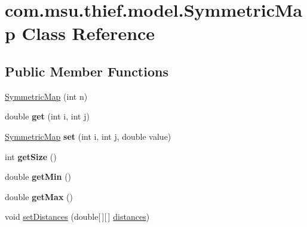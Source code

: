 \hypertarget{classcom_1_1msu_1_1thief_1_1model_1_1SymmetricMap}{\section{com.\-msu.\-thief.\-model.\-Symmetric\-Map Class Reference}
\label{classcom_1_1msu_1_1thief_1_1model_1_1SymmetricMap}
}
\subsection*{Public Member Functions}
\begin{DoxyCompactItemize}
\item 
\hyperlink{classcom_1_1msu_1_1thief_1_1model_1_1SymmetricMap_a44db52139f57eef76ba9b64d61059af7}{Symmetric\-Map} (int n)
\item 
\hypertarget{classcom_1_1msu_1_1thief_1_1model_1_1SymmetricMap_ac58ed31c7760c1c8bfc7a158f85c7f4f}{double {\bfseries get} (int i, int j)}\label{classcom_1_1msu_1_1thief_1_1model_1_1SymmetricMap_ac58ed31c7760c1c8bfc7a158f85c7f4f}

\item 
\hypertarget{classcom_1_1msu_1_1thief_1_1model_1_1SymmetricMap_a75dc77beaa0bfee44a501d9f40aff019}{\hyperlink{classcom_1_1msu_1_1thief_1_1model_1_1SymmetricMap}{Symmetric\-Map} {\bfseries set} (int i, int j, double value)}\label{classcom_1_1msu_1_1thief_1_1model_1_1SymmetricMap_a75dc77beaa0bfee44a501d9f40aff019}

\item 
\hypertarget{classcom_1_1msu_1_1thief_1_1model_1_1SymmetricMap_a13d6b4f187e2ae9f1e41d33f226b461c}{int {\bfseries get\-Size} ()}\label{classcom_1_1msu_1_1thief_1_1model_1_1SymmetricMap_a13d6b4f187e2ae9f1e41d33f226b461c}

\item 
\hypertarget{classcom_1_1msu_1_1thief_1_1model_1_1SymmetricMap_a729ec92b46e9a023477064db6d20d3e4}{double {\bfseries get\-Min} ()}\label{classcom_1_1msu_1_1thief_1_1model_1_1SymmetricMap_a729ec92b46e9a023477064db6d20d3e4}

\item 
\hypertarget{classcom_1_1msu_1_1thief_1_1model_1_1SymmetricMap_a1018195e0b1876d71b35254921b00ea5}{double {\bfseries get\-Max} ()}\label{classcom_1_1msu_1_1thief_1_1model_1_1SymmetricMap_a1018195e0b1876d71b35254921b00ea5}

\item 
void \hyperlink{classcom_1_1msu_1_1thief_1_1model_1_1SymmetricMap_ac3d0ed542debc70ee277486a9dddcb08}{set\-Distances} (double\mbox{[}$\,$\mbox{]}\mbox{[}$\,$\mbox{]} \hyperlink{classcom_1_1msu_1_1thief_1_1model_1_1SymmetricMap_a9807f5fdaef9e484d40fe13dfe7abc0d}{distances})
\end{DoxyCompactItemize}

